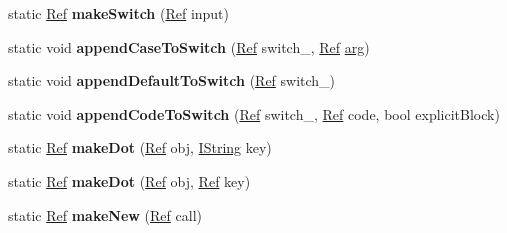 \begin{DoxyCompactItemize}
\item 
\mbox{\label{classcashew_1_1_value_builder_aec022cdede699d2e3241169691e5e4d8}} 
static \mbox{\hyperlink{structcashew_1_1_ref}{Ref}} {\bfseries make\+Switch} (\mbox{\hyperlink{structcashew_1_1_ref}{Ref}} input)
\item 
\mbox{\label{classcashew_1_1_value_builder_a5b197a29c984528dd0cf90572ddc6743}} 
static void {\bfseries append\+Case\+To\+Switch} (\mbox{\hyperlink{structcashew_1_1_ref}{Ref}} switch\+\_\+, \mbox{\hyperlink{structcashew_1_1_ref}{Ref}} \mbox{\hyperlink{unionarg}{arg}})
\item 
\mbox{\label{classcashew_1_1_value_builder_aad2466b82c9d1bcd478e9bdf3f277cac}} 
static void {\bfseries append\+Default\+To\+Switch} (\mbox{\hyperlink{structcashew_1_1_ref}{Ref}} switch\+\_\+)
\item 
\mbox{\label{classcashew_1_1_value_builder_a4afc26441cc0ec0e14e827af976596af}} 
static void {\bfseries append\+Code\+To\+Switch} (\mbox{\hyperlink{structcashew_1_1_ref}{Ref}} switch\+\_\+, \mbox{\hyperlink{structcashew_1_1_ref}{Ref}} code, bool explicit\+Block)
\item 
\mbox{\label{classcashew_1_1_value_builder_adb407322f32f4743e986f0d9a9cd413f}} 
static \mbox{\hyperlink{structcashew_1_1_ref}{Ref}} {\bfseries make\+Dot} (\mbox{\hyperlink{structcashew_1_1_ref}{Ref}} obj, \mbox{\hyperlink{structcashew_1_1_i_string}{I\+String}} key)
\item 
\mbox{\label{classcashew_1_1_value_builder_a4c300c1f50cdc792ef1b2f4431093c0d}} 
static \mbox{\hyperlink{structcashew_1_1_ref}{Ref}} {\bfseries make\+Dot} (\mbox{\hyperlink{structcashew_1_1_ref}{Ref}} obj, \mbox{\hyperlink{structcashew_1_1_ref}{Ref}} key)
\item 
\mbox{\label{classcashew_1_1_value_builder_a955089ab42eba62529b2dbbe066ebd2a}} 
static \mbox{\hyperlink{structcashew_1_1_ref}{Ref}} {\bfseries make\+New} (\mbox{\hyperlink{structcashew_1_1_ref}{Ref}} call)
\item 
\mbox{\label{classcashew_1_1_value_builder_afbcc0003f5d6bc90ca3e71cf6ff251ab}} 

\end{DoxyCompactItemize}

